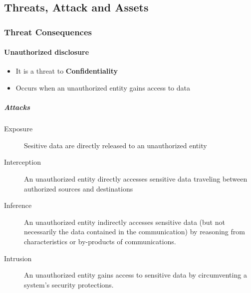 \documentclass{article}
\begin{document}
    \subsection{Threats, Attack and Assets}
            \subsubsection{Threat Consequences}
                    \paragraph{Unauthorized disclosure}
                        \begin{itemize}
                            \item It is a threat to \textbf{Confidentiality}
                            \item Occurs when an unauthorized entity gains access to data
                        \end{itemize}

                        \subparagraph{Attacks}
                            \begin{description}
                                \item[Exposure] Sesitive data are directly released to an unauthorized entity
                                \item[Interception] An unauthorized entity directly accesses sensitive data traveling between authorized sources and destinations
                                \item[Inference] An unauthorized entity indirectly accesses sensitive data (but not necessarily the data contained in the communication) by reasoning from characteristics or by-products of communications.
                                \item[Intrusion]  An unauthorized entity gains access to sensitive data by circumventing a system’s security protections.
                            \end{description}
\end{document}
